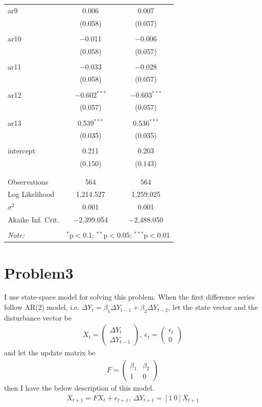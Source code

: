 \documentclass{article}
\begin{document}
\begin{table}[!htbp]
\begin{tabular}{@{\extracolsep{5pt}}lcc}
 ar9 & 0.006 & 0.007 \\ 
  & (0.058) & (0.057) \\ 
  & & \\ 
 ar10 & $-$0.011 & $-$0.006 \\ 
  & (0.058) & (0.057) \\ 
  & & \\ 
 ar11 & $-$0.033 & $-$0.028 \\ 
  & (0.058) & (0.057) \\ 
  & & \\ 
 ar12 & $-$0.602$^{***}$ & $-$0.603$^{***}$ \\ 
  & (0.057) & (0.057) \\ 
  & & \\ 
 ar13 & 0.539$^{***}$ & 0.536$^{***}$ \\ 
  & (0.035) & (0.035) \\ 
  & & \\ 
 intercept & 0.211 & 0.203 \\ 
  & (0.150) & (0.143) \\ 
  & & \\ 
\hline \\[-1.8ex] 
Observations & 564 & 564 \\ 
Log Likelihood & 1,214.527 & 1,259.025 \\ 
$\sigma^{2}$ & 0.001 & 0.001 \\ 
Akaike Inf. Crit. & $-$2,399.054 & $-$2,488.050 \\ 
\hline 
\hline \\[-1.8ex] 
\textit{Note:}  & \multicolumn{2}{r}{$^{*}$p$<$0.1; $^{**}$p$<$0.05; $^{***}$p$<$0.01} \\ 
\end{tabular} 
\end{table} 


\section{Problem3}
 I use state-space model for solving this problem. When the first difference series follow AR(2) model, i.e. $\Delta Y_t = \beta_1 \Delta Y_{t-1}+ \beta_2 \Delta Y_{t-2}$, let the state vector and the disturbance vector be
 \begin{align*}
 	X_t = \begin{pmatrix}
	\Delta Y_t \\
	\Delta Y_{t-1}
	\end{pmatrix},\ 
	e_{t} = \begin{pmatrix}
	\epsilon_{t}\\
	0
	\end{pmatrix}
 \end{align*}
 and let the update matrix be
 \begin{align*}
 	F = \begin{pmatrix}
	\beta_1 & \beta_2\\
	1 & 0
	\end{pmatrix}
 \end{align*}
then I have the below description of this model.
\begin{align*}
	X_{t+1} = F X_t + e_{t+1},\ \Delta Y_{t+1} = [1\ 0] X_{t+1}
\end{align*}
\end{document}
